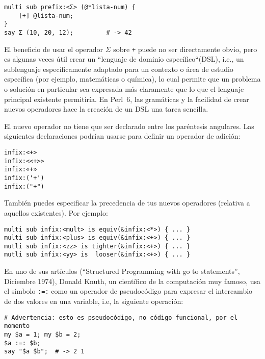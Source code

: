 \begin{verbatim}
multi sub prefix:<Σ> (@*lista-num) {
    [+] @lista-num;
}
say Σ (10, 20, 12);         # -> 42
\end{verbatim}

El beneficio de usar el operador $\Sigma$ sobre \verb|+| puede no 
ser directamente obvio, pero es algunas veces útil crear un ``lenguaje
de dominio específico``(DSL), i.e., un sublenguaje específicamente adaptado
para un contexto o área de estudio específica (por ejemplo, matemáticas o química),
lo cual permite que un problema o solución en particular sea expresada más
claramente que lo que el lenguaje principal existente permitiría. En Perl~6, 
las gramáticas y la facilidad de crear nuevos operadores hace la 
creación de un DSL una tarea sencilla.


El nuevo operador no tiene que ser declarado entre los paréntesis angulares.
Las siguientes declaraciones podrían usarse para definir un operador de
adición:

\begin{verbatim}
infix:<+>
infix:<<+>>
infix:«+»
infix:('+')
infix:("+")
\end{verbatim}

También puedes especificar la precedencia de tus nuevos operadores
(relativa a aquellos existentes). Por ejemplo:

\begin{verbatim}
multi sub infix:<mult> is equiv(&infix:<*>) { ... }
multi sub infix:<plus> is equiv(&infix:<+>) { ... }
mutli sub infix:<zz> is tighter(&infix:<+>) { ... }
mutli sub infix:<yy> is  looser(&infix:<+>) { ... }
\end{verbatim}

En uno de sus artículos (``Structured Programming with 
go to statements'', Diciembre 1974), Donald Knuth, un científico
de la computación muy famoso, usa el símbolo \verb|:=:| como un 
operador de pseudocódigo para expresar el intercambio de dos valores
en una variable, i.e, la siguiente operación:

\begin{verbatim}
# Advertencia: esto es pseudocódigo, no código funcional, por el momento
my $a = 1; my $b = 2;
$a :=: $b; 
say "$a $b";  # -> 2 1 
\end{verbatim}


